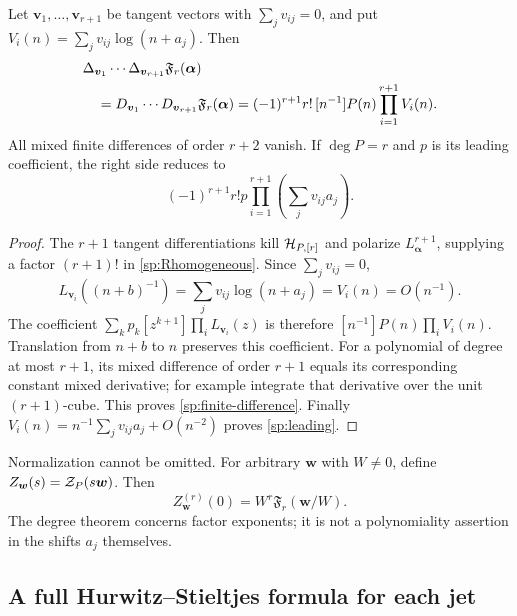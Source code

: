 \begin{theorem}\label{sp:thm:polarization}
Let $\boldsymbol v_1,\ldots,\boldsymbol v_{r+1}$ be tangent vectors
with $\sum_jv_{ij}=0$, and put
$V_i(n)=\sum_jv_{ij}\log(n+a_j)$. Then
\begin{align}\label{sp:finite-difference}
 &\Delta_{\boldsymbol v_1}\cdots\Delta_{\boldsymbol v_{r+1}}
       \mathfrak F_r(\boldsymbol\alpha)\notag\\
 &\quad=D_{\boldsymbol v_1}\cdots D_{\boldsymbol v_{r+1}}
       \mathfrak F_r(\boldsymbol\alpha)
       =(-1)^{r+1}r!\,[n^{-1}]P(n)\prod_{i=1}^{r+1}V_i(n).
\end{align}
All mixed finite differences of order $r+2$ vanish. If $\deg P=r$
and $p$ is its leading coefficient, the right side reduces to
\begin{equation}\label{sp:leading}
 (-1)^{r+1}r!p
             \prod_{i=1}^{r+1}\left(\sum_jv_{ij}a_j\right).
\end{equation}
\end{theorem}

\begin{proof}
The $r+1$ tangent differentiations kill $\mathcal H_{P,[r]}$ and polarize
$L_{\boldsymbol\alpha}^{r+1}$, supplying a factor $(r+1)!$ in
\eqref{sp:Rhomogeneous}. Since $\sum_jv_{ij}=0$,
\[
 L_{\boldsymbol v_i}((n+b)^{-1})
   =\sum_jv_{ij}\log(n+a_j)=V_i(n)=O(n^{-1}).
\]
The coefficient $\sum_k p_k[z^{k+1}]\prod_iL_{\boldsymbol v_i}(z)$
is therefore $[n^{-1}]P(n)\prod_i V_i(n)$. Translation from $n+b$
to $n$ preserves this coefficient. For a polynomial of degree at most
$r+1$, its mixed difference of order $r+1$ equals its corresponding
constant mixed derivative; for example integrate that derivative over
the unit $(r+1)$-cube. This proves \eqref{sp:finite-difference}.
Finally $V_i(n)=n^{-1}\sum_jv_{ij}a_j+O(n^{-2})$ proves
\eqref{sp:leading}.
\end{proof}

Normalization cannot be omitted. For arbitrary $\boldsymbol w$ with
$W\ne0$, define $Z_{\boldsymbol w}(s)=\mathcal Z_P(s\boldsymbol w)$.
Then
\begin{equation}\label{sp:scaling}
 Z_{\boldsymbol w}^{(r)}(0)
       =W^r\mathfrak F_r(\boldsymbol w/W).
\end{equation}
The degree theorem concerns factor exponents; it is not a polynomiality
assertion in the shifts $a_j$ themselves.

\subsection{A full Hurwitz--Stieltjes formula for each jet}

